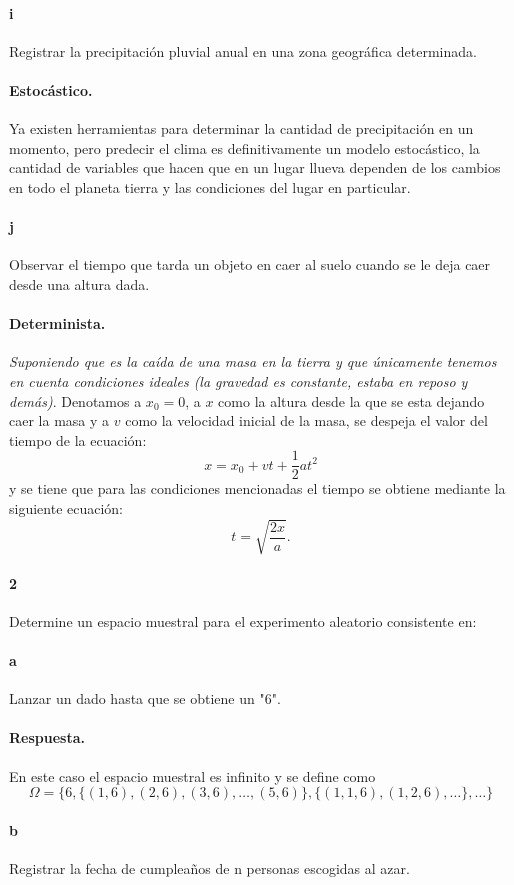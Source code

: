 \documentclass{article}
\begin{document}
\paragraph{i} Registrar la precipitación pluvial anual en una zona geográfica determinada.
\paragraph{Estocástico.} Ya existen herramientas para determinar la cantidad de precipitación en un momento, pero predecir el clima es definitivamente un modelo estocástico, la cantidad de variables que hacen que en un lugar llueva dependen de los cambios en todo el planeta tierra y las condiciones del lugar en particular.
\paragraph{j} Observar el tiempo que tarda un objeto en caer al suelo cuando se le deja caer desde una altura dada.
\paragraph{Determinista.} \textit{Suponiendo que es la caída de una masa en la tierra y que únicamente tenemos en cuenta condiciones ideales (la gravedad es constante, estaba en reposo y demás)}. Denotamos a $x_0 = 0$, a $x$ como la altura desde la que se esta dejando caer la masa y a $v$ como la velocidad inicial de la masa, se despeja el valor del tiempo de la ecuación:
$$x = x_0 + vt + \frac{1}{2}at^2$$
y se tiene que para las condiciones mencionadas el tiempo se obtiene mediante la siguiente ecuación:
$$t = \sqrt{\frac{2x}{a}}.$$
\paragraph{2} Determine un espacio muestral para el experimento aleatorio consistente en:
\paragraph{a} Lanzar un dado hasta que se obtiene un "6".
\paragraph{Respuesta.} En este caso el espacio muestral es infinito y se define como
$$\Omega = \{ 6, \{(1,6), (2,6), (3,6), \dots, (5,6)\}, \{ (1,1,6), (1,2,6), \dots \}, \dots
\}$$
\paragraph{b} Registrar la fecha de cumpleaños de n personas escogidas al azar.
\end{document}
